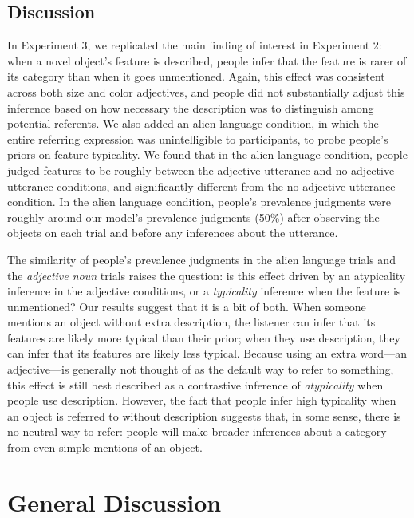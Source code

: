 \documentclass[
  english,
  man,floatsintext]{apa6}
\begin{document}
\hypertarget{discussion-2}{%
\subsection{Discussion}\label{discussion-2}}

In Experiment 3, we replicated the main finding of interest in Experiment 2: when a novel object's feature is described, people infer that the feature is rarer of its category than when it goes unmentioned. Again, this effect was consistent across both size and color adjectives, and people did not substantially adjust this inference based on how necessary the description was to distinguish among potential referents. We also added an alien language condition, in which the entire referring expression was unintelligible to participants, to probe people's priors on feature typicality. We found that in the alien language condition, people judged features to be roughly between the adjective utterance and no adjective utterance conditions, and significantly different from the no adjective utterance condition. In the alien language condition, people's prevalence judgments were roughly around our model's prevalence judgments (50\%) after observing the objects on each trial and before any inferences about the utterance.

The similarity of people's prevalence judgments in the alien language trials and the \emph{adjective noun} trials raises the question: is this effect driven by an atypicality inference in the adjective conditions, or a \emph{typicality} inference when the feature is unmentioned? Our results suggest that it is a bit of both. When someone mentions an object without extra description, the listener can infer that its features are likely more typical than their prior; when they use description, they can infer that its features are likely less typical. Because using an extra word---an adjective---is generally not thought of as the default way to refer to something, this effect is still best described as a contrastive inference of \emph{atypicality} when people use description. However, the fact that people infer high typicality when an object is referred to without description suggests that, in some sense, there is no neutral way to refer: people will make broader inferences about a category from even simple mentions of an object.

\hypertarget{general-discussion}{%
\section{General Discussion}\label{general-discussion}}
\end{document}
